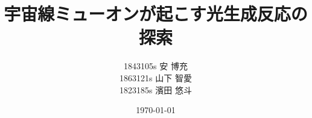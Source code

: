\documentclass[a4paper,uplatex]{jsreport}
\begin{document}
\title{宇宙線ミューオンが起こす光生成反応の探索}
\author{1843105s 安 博充\\
        1863121s 山下 智愛\\
        1823185s 濱田 悠斗
}
\date{\today} %

\maketitle %
\tableofcontents %












\printbibliography[title = 参考文献]

\nocite{sotuken}
\end{document}
